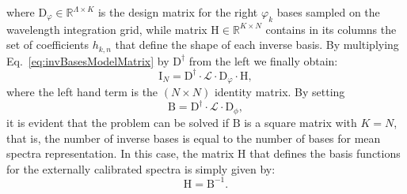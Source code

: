 \documentclass{aa}
\newcommand{\equref}[1]{Eq.~\ref{eq:#1}}
\begin{document}
where $\mathrm{D}_\varphi \in\mathbb{R}^{\Lambda \times K}$ is the design matrix for the right $\varphi_k$ bases sampled on the wavelength integration grid, while matrix $\mathrm{H} \in\mathbb{R}^{K \times N}$ contains in its columns the set of coefficients $h_{k,n}$ that define the shape of each inverse basis.
By multiplying \equref{invBasesModelMatrix} by $\mathrm{D}^\dagger$ from the left we finally obtain:
\begin{equation}
    \mathrm{I}_N =  \mathrm{D}^\dagger \cdot \mathcal{L} \cdot \mathrm{D}_\varphi \cdot \mathrm{H}
,\end{equation}
where the left hand term is the $(N\times N)$ identity matrix.
By setting
\begin{equation}
    \mathrm{B} =  \mathrm{D}^\dagger \cdot \mathcal{L} \cdot \mathrm{D}_\phi
,\end{equation}
it is evident that the problem can be solved if $\mathrm{B}$ is a square matrix with $K=N$, that is, the number of inverse bases is equal to the number of bases for mean spectra representation.
In this case, the matrix $\mathrm{H}$ that defines the basis functions for the externally calibrated spectra 
is simply given by:
\begin{equation}
    \mathrm{H} =  \mathrm{B}^{-1}
.\end{equation}

\end{document}
